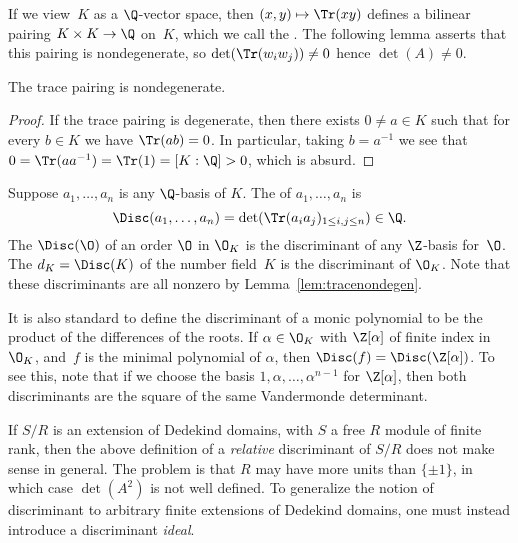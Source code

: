 If we view~$K$ as a $\Q$-vector space, then $(x,y)\mapsto \Tr(xy)$
defines a bilinear pairing $K\times K \to \Q$ on~$K$, which we call
the .  The following lemma asserts that this
pairing is nondegenerate, so $\det(\Tr(w_i w_j))\neq 0$ hence
$\det(A)\neq 0$.
\begin{lemma}\label{lem:tracenondegen}
The trace pairing is nondegenerate.
\end{lemma}
\begin{proof}
If the trace pairing is degenerate, then there exists $0\neq a\in K$ such
that for every $b\in K$ we have $\Tr(ab)=0$.  In particular, taking
$b=a^{-1}$ we see that $0=\Tr(a a^{-1})=\Tr(1)=[K:\Q]>0$, which is
absurd.
\end{proof}

\begin{definition}[Discriminant]\label{def:disc}
Suppose $a_1,\ldots, a_n$ is any $\Q$-basis of $K$.  The 
of $a_1,\ldots, a_n$ is
$$
  \Disc(a_1,\ldots,a_n) = \det(\Tr(a_i a_j)_{1\leq i,j\leq n})\in\Q.
$$
The  $\Disc(\O)$ of an order $\O$ in $\O_K$ is
the discriminant of any $\Z$-basis for~$\O$.
The  $d_K=\Disc(K)$ of the number field~$K$
is the discriminant of $\O_K$.
Note that these discriminants are all nonzero
by Lemma~\ref{lem:tracenondegen}.
\end{definition}

\begin{remark}
  It is also standard to define the discriminant of a monic polynomial
  to be the product of the differences of the roots.  If $\alpha\in
  \O_K$ with $\Z[\alpha]$ of finite index in $\O_K$, and~$f$ is the
  minimal polynomial of $\alpha$, then $\Disc(f)=\Disc(\Z[\alpha])$.
  To see this, note that if we choose the basis
  $1,\alpha,\ldots,\alpha^{n-1}$ for $\Z[\alpha]$, then both
  discriminants are the square of the same Vandermonde determinant.
\end{remark}



\begin{remark}
If $S/R$ is an extension of Dedekind domains, with $S$ a free $R$
module of finite rank, then the above definition of a {\em relative}
discriminant of $S/R$ does not make sense in general.  The problem
is that $R$ may have more units than $\{\pm 1\}$, in which case
$\det(A^2)$ is not well defined.   To generalize the notion of
discriminant to arbitrary finite extensions of Dedekind domains,
one must instead introduce a discriminant {\em ideal}.
\end{remark}


